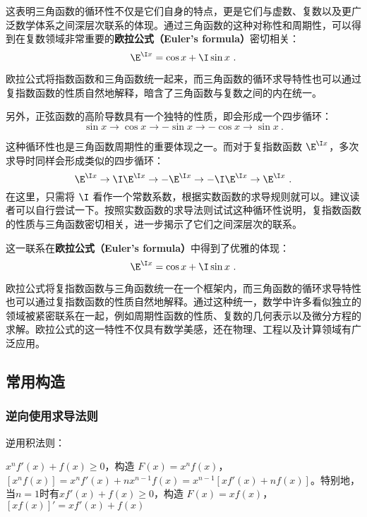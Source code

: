 这表明三角函数的循环性不仅是它们自身的特点，更是它们与虚数、复数以及更广泛数学体系之间深层次联系的体现。通过三角函数的这种对称性和周期性，可以得到在复数领域非常重要的\textbf{欧拉公式（Euler’s formula）}密切相关：
\begin{equation}
\E^{\I x} = \cos x + \I\sin x~.
\end{equation}

欧拉公式将指数函数和三角函数统一起来，而三角函数的循环求导特性也可以通过复指数函数的性质自然地解释，暗含了三角函数与复数之间的内在统一。

另外，正弦函数的高阶导数具有一个独特的性质，即会形成一个四步循环：
\begin{equation}
\sin x \to \cos x \to -\sin x \to -\cos x \to \sin x~.
\end{equation}

这种循环性也是三角函数周期性的重要体现之一。而对于复指数函数 $\E^{\I x}$，多次求导时同样会形成类似的四步循环：
\begin{equation}
\E^{\I x} \to \I\E^{\I x} \to -\E^{\I x} \to -\I\E^{\I x} \to \E^{\I x}~.
\end{equation}
在这里，只需将 $\I$ 看作一个常数系数，根据实数函数的求导规则就可以。建议读者可以自行尝试一下。按照实数函数的求导法则试试这种循环性说明，复指数函数的性质与三角函数密切相关，进一步揭示了它们之间深层次的联系。

这一联系在\textbf{欧拉公式（Euler’s formula）}中得到了优雅的体现：
\begin{equation}
\E^{\I x} = \cos x + \I\sin x~.
\end{equation}

欧拉公式将复指数函数与三角函数统一在一个框架内，而三角函数的循环求导特性也可以通过复指数函数的性质自然地解释。通过这种统一，数学中许多看似独立的领域被紧密联系在一起，例如周期性函数的性质、复数的几何表示以及微分方程的求解。欧拉公式的这一特性不仅具有数学美感，还在物理、工程以及计算领域有广泛应用。


\subsection{常用构造}


\subsubsection{逆向使用求导法则}

逆用积法则：

$x^n f'(x) + f(x) \geq 0$，构造 $F(x) = x^n f(x)$，$[x^n f(x)] = x^n f'(x) + nx^{n-1} f(x) = x^{n-1} [x f'(x) + nf(x)]$。特别地，当$n=1$时有$x f'(x) + f(x) \geq 0$，构造 $F(x) = x f(x)$，$[x f(x)]' = x f'(x) + f(x)$

